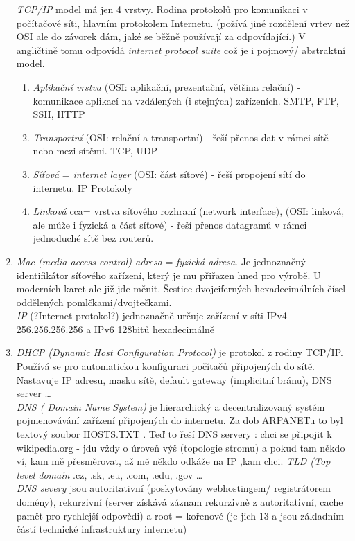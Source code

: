 \documentclass[12pt]{article}
\begin{document}
\begin{enumerate}
\begin{enumerate}
\end{enumerate}
\emph{TCP/IP} model má jen 4 vrstvy. Rodina protokolů pro komunikaci v počítačové síti, hlavním protokolem Internetu. (požívá jiné rozdělení vrtev než OSI ale do závorek dám, jaké se běžně používají za odpovídající.) V angličtině tomu odpovídá \emph{internet protocol suite} což je i pojmový/ abstraktní model.
\begin{enumerate}
\item \emph{Aplikační vrstva} (OSI: aplikační, prezentační, většina relační) - komunikace aplikací na vzdálených (i stejných) zařízeních. SMTP, FTP, SSH, HTTP
\item \emph{Transportní} (OSI: relační a transportní) - řeší přenos dat v rámci sítě nebo mezi sítěmi. TCP, UDP
\item \emph{Síťová} = \emph{internet layer} (OSI: část síťové) - řeší propojení sítí do internetu. IP Protokoly
\item \emph{Linková} cca= vrstva síťového rozhraní (network interface), (OSI: linková, ale může i fyzická a část síťové) - řeší přenos datagramů v rámci jednoduché sítě bez routerů.
\end{enumerate}
\item \emph{Mac (media access control) adresa} = \emph{fyzická adresa}. Je jednoznačný identifikátor síťového zařízení, který je mu přiřazen hned pro výrobě. U moderních karet ale již jde měnit. Šestice dvojciferných hexadecimálních čísel oddělených pomlčkami/dvojtečkami.\\
\emph{IP} (?Internet protokol?) jednoznačně určuje zařízení v síti IPv4 256.256.256.256 a IPv6 128bitů hexadecimálně
\item \emph{DHCP (Dynamic Host Configuration Protocol)} je protokol z rodiny TCP/IP. Používá se pro automatickou konfiguraci počítačů připojených do sítě. Nastavuje IP adresu, masku sítě,  default gateway (implicitní bránu), DNS server \dots \\
\emph{DNS ( Domain Name System)} je hierarchický a decentralizovaný systém pojmenovávání zařízení připojených do internetu. Za dob ARPANETu  to byl textový soubor HOSTS.TXT . Teď to řeší DNS servery : chci se připojit k wikipedia.org - jdu vždy o úroveň výš (topologie stromu) a pokud tam někdo ví, kam mě přesměrovat, až mě někdo odkáže na IP ,kam chci. \emph{TLD (Top level domain} .cz, .sk, .eu, .com, .edu, .gov  \dots\\
\emph{DNS severy} jsou autoritativní (poskytovány webhostingem/ registrátorem domény), rekurzivní (server získává záznam rekurzivně z autoritativní, cache paměť pro rychlejší odpovědi) a root = kořenové (je jich 13 a jsou základním částí technické infrastruktury internetu)

\end{enumerate}
\end{document}
